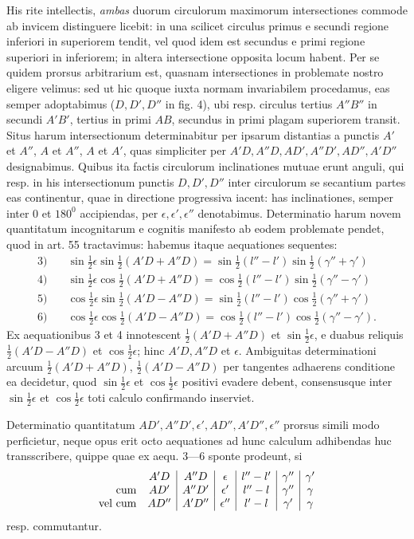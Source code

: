 His rite intellectis, \emph{ambas} duorum circulorum maximorum intersectiones
commode ab invicem distinguere licebit: in una scilicet circulus primus e secundi
regione inferiori in superiorem tendit, vel quod idem est secundus e
primi regione superiori in inferiorem; in altera intersectione opposita locum
habent. Per se quidem prorsus arbitrarium est, quasnam intersectiones in
problemate nostro eligere velimus: sed ut hic quoque iuxta normam invariabilem
procedamus, eas semper adoptabimus ($D,D',D''$ in fig. 4), ubi resp.
circulus tertius $A''B''$ in secundi $A'B'$, tertius in primi $AB$, secundus in primi
plagam superiorem transit. Situs harum intersectionum determinabitur per
\hypertarget{native-184}{}ipsarum distantias a punctis $A'$ et $A''$, $A$ et $A''$, $A$ et $A'$, quas simpliciter
per $A'D,A''D,AD',A''D',AD'',A'D''$ designabimus. Quibus ita factis circulorum
inclinationes mutuae erunt anguli, qui resp. in his intersectionum
punctis $D,D',D''$ inter circulorum se secantium partes eas continentur, quae
in directione progressiva iacent: has inclinationes, semper inter $0$ et $180^0$ accipiendas,
per $\epsilon,\epsilon',\epsilon''$ denotabimus. Determinatio harum novem quantitatum
incognitarum e cognitis manifesto ab eodem problemate pendet, quod in art. 55
tractavimus: habemus itaque aequationes sequentes:
\[
\begin{aligned}
3)\quad&\sin\tfrac12\epsilon\sin\tfrac12(A'D+A''D)=\sin\tfrac12(l''-l')\sin\tfrac12(\gamma''+\gamma')\\[.5ex]
4)\quad&\sin\tfrac12\epsilon\cos\tfrac12(A'D+A''D)=\cos\tfrac12(l''-l')\sin\tfrac12(\gamma''-\gamma')\\[.5ex]
5)\quad&\cos\tfrac12\epsilon\sin\tfrac12(A'D-A''D)=\sin\tfrac12(l''-l')\cos\tfrac12(\gamma''+\gamma')\\[.5ex]
6)\quad&\cos\tfrac12\epsilon\cos\tfrac12(A'D-A''D)=\cos\tfrac12(l''-l')\cos\tfrac12(\gamma''-\gamma').
\end{aligned}
\]
Ex aequationibus 3 et 4 innotescent $\tfrac12(A'D+A''D)$ et $\sin\tfrac12\epsilon$, e duabus reliquis
$\tfrac12(A'D-A''D)$ et $\cos\tfrac12\epsilon$; hinc $A'D,A''D$ et $\epsilon$. Ambiguitas determinationi arcuum
$\tfrac12(A'D+A''D)$, $\tfrac12(A'D-A''D)$ per tangentes adhaerens conditione ea
decidetur, quod $\sin\tfrac12\epsilon$ et $\cos\tfrac12\epsilon$ positivi evadere debent, consensusque inter
$\sin\tfrac12\epsilon$ et $\cos\tfrac12\epsilon$ toti calculo confirmando inserviet.

Determinatio quantitatum $AD',A''D',\epsilon',AD'',A'D'',\epsilon''$ prorsus simili
modo perficietur, neque opus erit octo aequationes ad hunc calculum adhibendas
huc transscribere, quippe quae ex aequ. 3---6 sponte prodeunt, si
\[
\begin{array}{r c|c|c|c|c|c}
 & A'D & A''D & \epsilon & l''-l' & \gamma'' & \gamma'\\
\text{cum} & AD' & A''D' & \epsilon' & l''-l & \gamma'' & \gamma\\
\text{vel cum} & AD'' & A'D'' & \epsilon'' & l'-l & \gamma' & \gamma
\end{array}
\]
resp. commutantur.

